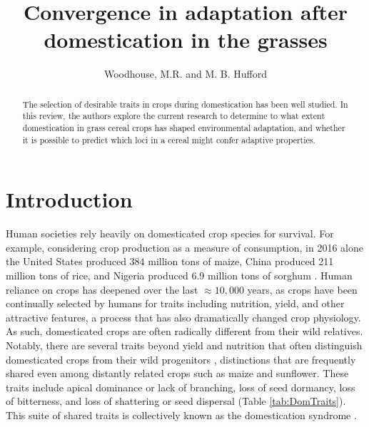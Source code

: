 \documentclass[12pt]{article}
\title{Convergence in adaptation after domestication in the grasses}
\author{Woodhouse, M.R. and M. B. Hufford}
\begin{document}
\maketitle

\begin{abstract}
The selection of desirable traits in crops during domestication has been well studied. In this review, the authors explore the current research to determine to what extent domestication in grass cereal crops has shaped environmental adaptation, and whether it is possible to predict which loci in a cereal might confer adaptive properties.
\end{abstract}

\section*{Introduction}
Human societies rely heavily on domesticated crop species for survival.
For example, considering crop production as a measure of consumption, in 2016 alone the United States produced 384 million tons of maize, China produced 211 million tons of rice, and Nigeria produced 6.9 million tons of sorghum \citep{FAOSTAT2018}.
Human reliance on crops has deepened over the last $\approx10,000$ years, as crops have been continually selected by humans for traits including nutrition, yield, and other attractive features, a process that has also dramatically changed crop physiology.
As such, domesticated crops are often radically different from their wild relatives.
Notably, there are several traits beyond yield and nutrition that often distinguish domesticated crops from their wild progenitors \citep{Doebley2006}, distinctions that are frequently shared even among distantly related crops such as maize and sunflower.
These traits include apical dominance or lack of branching, loss of seed dormancy, loss of bitterness, and loss of shattering or seed dispersal (Table \ref{tab:DomTraits}).
This suite of shared traits is collectively known as the domestication syndrome \citep{Hammer1984}.
\end{document}
